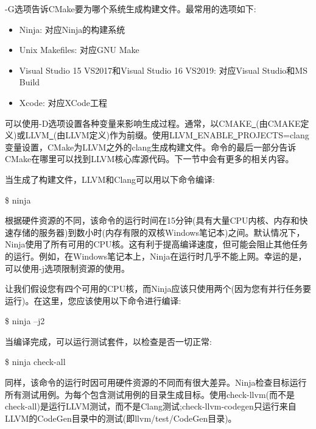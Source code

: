 -G选项告诉CMake要为哪个系统生成构建文件。最常用的选项如下:\par

\begin{itemize}
	\item Ninja: 对应Ninja的构建系统
	\item Unix Makefiles: 对应GNU Make
	\item Visual Studio 15 VS2017和Visual Studio 16 VS2019: 对应Visual Studio和MS Build
	\item Xcode: 对应XCode工程
\end{itemize}

可以使用-D选项设置各种变量来影响生成过程。通常，以CMAKE\underline{~}(由CMAKE定义)或LLVM\underline{~}(由LLVM定义)作为前缀。使用LLVM\underline{~}ENABLE\underline{~}PROJECTS=clang变量设置，CMake为LLVM之外的clang生成构建文件。命令的最后一部分告诉CMake在哪里可以找到LLVM核心库源代码。下一节中会有更多的相关内容。\par

当生成了构建文件，LLVM和Clang可以用以下命令编译:\par

\begin{tcolorbox}[colback=white,colframe=black]
	\$ ninja
\end{tcolorbox}

根据硬件资源的不同，该命令的运行时间在15分钟(具有大量CPU内核、内存和快速存储的服务器)到数小时(内存有限的双核Windows笔记本)之间。默认情况下，Ninja使用了所有可用的CPU核。这有利于提高编译速度，但可能会阻止其他任务的运行。例如，在Windows笔记本上，Ninja在运行时几乎不能上网。幸运的是，可以使用-j选项限制资源的使用。\par

让我们假设您有四个可用的CPU核，而Ninja应该只使用两个(因为您有并行任务要运行)。在这里，您应该使用以下命令进行编译:\par

\begin{tcolorbox}[colback=white,colframe=black]
	\$ ninja –j2
\end{tcolorbox}

当编译完成，可以运行测试套件，以检查是否一切正常:\par

\begin{tcolorbox}[colback=white,colframe=black]
	\$ ninja check-all
\end{tcolorbox}

同样，该命令的运行时因可用硬件资源的不同而有很大差异。Ninja检查目标运行所有测试用例。为每个包含测试用例的目录生成目标。使用check-llvm(而不是check-all)是运行LLVM测试，而不是Clang测试;check-llvm-codegen只运行来自LLVM的CodeGen目录中的测试(即llvm/test/CodeGen目录)。\par

